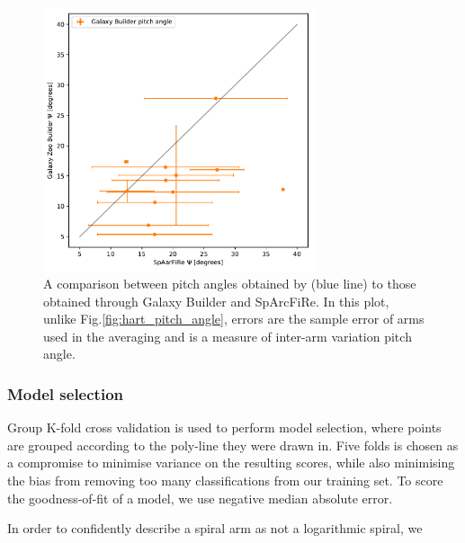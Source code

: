 \documentclass[../main.tex]{subfiles}
\begin{document}
\begin{figure}
  \includegraphics[width=8cm]{images__results/pitch-angle-comparison2.pdf}
  \caption{A comparison between pitch angles obtained by \citet{Hart2016:1607.01019v1} (blue line) to those obtained through Galaxy Builder and SpArcFiRe. In this plot, unlike Fig.\ref{fig:hart_pitch_angle}, errors are the sample error of arms used in the averaging and is a measure of inter-arm variation pitch angle.}
  \label{fig:sparcfire_pitch_angle}
\end{figure}


\subsubsection{Model selection}


Group K-fold cross validation is used to perform model selection, where points are grouped according to the poly-line they were drawn in. Five folds is chosen as a compromise to minimise variance on the resulting scores, while also minimising the bias from removing too many classifications from our training set. To score the goodness-of-fit of a model, we use negative median absolute error.

In order to confidently describe a spiral arm as not a logarithmic spiral, we 
\end{document}
